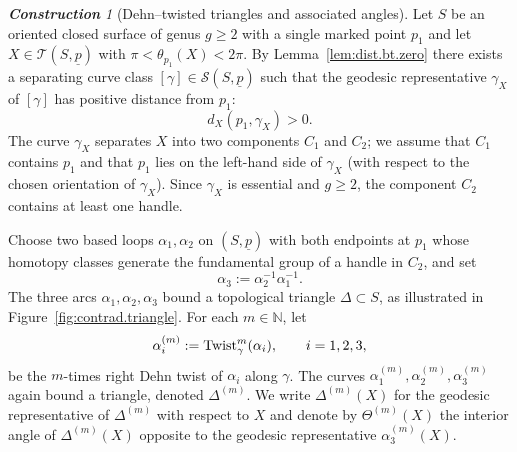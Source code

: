 \documentclass[11pt, letterpaper]{amsart}
\theoremstyle{definition}
\theoremstyle{remark}
\newtheorem{construction}[theorem]{\rm\bf Construction}
\newcommand{\up}{\underline{p}}
\newcommand{\Sp}{(S,\up)}
\newcommand{\cT}{\mathcal{T}}
\newcommand{\cS}{\mathcal{S}}
\numberwithin{equation}{section}
\begin{document}
\begin{construction}[Dehn–twisted triangles and associated angles]
\label{constr:triang.degen.}
Let \(S\) be an oriented closed surface of genus \(g\ge 2\) with a single
marked point \(p_1\) and let \(X\in\cT\Sp\) with
\(\pi<\theta_{p_1}(X)<2\pi\).
By Lemma~\ref{lem:dist.bt.zero} there exists a separating curve class
\([\gamma]\in\cS\Sp\) such that the geodesic representative \(\gamma_X\) of
\([\gamma]\) has positive distance from \(p_1\):
\[
d_X(p_1,\gamma_X)>0.
\]
The curve \(\gamma_X\) separates \(X\) into two components \(C_1\) and \(C_2\);
we assume that \(C_1\) contains \(p_1\) and that \(p_1\) lies on the left-hand
side of \(\gamma_X\) (with respect to the chosen orientation of \(\gamma_X\)).
Since \(\gamma_X\) is essential and \(g\ge 2\), the component \(C_2\) contains
at least one handle.

Choose two based loops \(\alpha_1,\alpha_2\) on \(\Sp\) with both endpoints at
\(p_1\) whose homotopy classes generate the fundamental group of a handle in
\(C_2\), and set
\[
\alpha_3 := \alpha_2^{-1}\alpha_1^{-1}.
\]
The three arcs \(\alpha_1,\alpha_2,\alpha_3\) bound a topological triangle
\(\Delta\subset S\), as illustrated in Figure~\ref{fig:contrad.triangle}.
For each \(m\in\mathbb N\), let
\[
\alpha_i^{(m)} := {\rm Twist}^m_{\gamma}(\alpha_i),
\qquad i=1,2,3,
\]
be the \(m\)-times right Dehn twist of \(\alpha_i\) along \(\gamma\).
The curves \(\alpha_1^{(m)},\alpha_2^{(m)},\alpha_3^{(m)}\) again bound a
triangle, denoted \(\Delta^{(m)}\).
We write \(\Delta^{(m)}(X)\) for the geodesic representative of
\(\Delta^{(m)}\) with respect to \(X\) and denote by \(\Theta^{(m)}(X)\) the
interior angle of \(\Delta^{(m)}(X)\) opposite to the geodesic representative
\(\alpha_3^{(m)}(X)\).


\end{construction}
\end{document}

